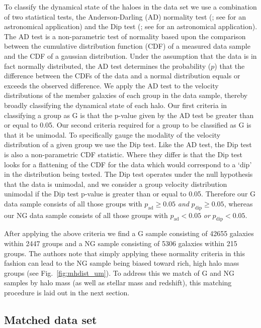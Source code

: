 \documentclass[a4paper,fleqn,usenatbib]{mnras}
\begin{document}
To classify the dynamical state of the haloes in the data set we use a
combination of two statistical tests, the Anderson-Darling (AD)
normality test (\citealt{anderson1952}; see \citealt{hou2009, hou2013}
for an astronomical application) and the Dip test
(\citealt{hartigan1985}; see \citealt{ribeiro2013} for an astronomical
application).  The AD test is a non-parametric test of normality based
upon the comparison between the cumulative distribution function (CDF) of a
measured data sample and the CDF of a gaussian distribution.  Under
the assumption that the data is in fact normally distributed, the AD
test determines the probability ($p$) that the difference between
the CDFs of the data and a normal distribution equals or exceeds the
observed difference.  We apply the AD test to the velocity
distributions of the member galaxies of each group in the data sample,
thereby broadly classifying the dynamical state of each halo.  Our
first criteria in classifying a group as G is that the p-value given
by the AD test be greater than or equal to 0.05.  Our second criteria
required for a
group to be classified as G is that it be unimodal.  To specifically
gauge the modality of the velocity distribution of a given group we
use the Dip test.  Like the AD test, the Dip test is also a
non-parametric CDF statistic.  Where they differ is that the Dip test
looks for a flattening of the CDF for the data which would correspond
to a `dip' in the distribution being tested.  The Dip test operates
under the null hypothesis that the data is unimodal, and we consider a
group velocity distribution unimodal if the Dip test p-value is
greater than or equal to 0.05.  Therefore our G data sample consists
of all those groups with $p_{\text{ad}} \ge 0.05$
\emph{and} $p_{\text{dip}} \ge 0.05$, whereas our NG data
sample consists of all those groups with $p_{\text{ad}} < 0.05$
\emph{or} $p_{\text{dip}} < 0.05$.
\par
After applying the above criteria we find a G sample consisting of
42655 galaxies within 2447 groups and a NG sample consisting of 5306
galaxies within 215 groups.  The authors note that simply applying
these normality criteria in this fashion can lead to the NG sample
being biased toward rich, high halo mass groups (see
Fig.~\ref{fig:mhdist_um}).  To address this we
match of G and NG samples by halo mass (as well as stellar mass and
redshift), this matching procedure is laid out in the next section.

\subsection{Matched data set}
\end{document}
